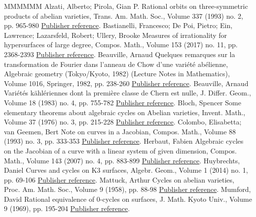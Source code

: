 \begin{thebibliography}{MMMMMM}
 Alzati, Alberto; Pirola, Gian P. Rational orbits on three-symmetric products of abelian varieties, Trans. Am. Math. Soc., Volume 337 (1993) no. 2, pp. 965-980 \href{https://ahl.centre-mersenne.org/item/AHL_2018__1__313_0/#alzatipirola}{Publisher reference}.
 Bastianelli, Francesco; De Poi, Pietro; Ein, Lawrence; Lazarsfeld, Robert; Ullery, Brooke Measures of irrationality for hypersurfaces of large degree, Compos. Math., Volume 153 (2017) no. 11, pp. 2368-2393 \href{https://ahl.centre-mersenne.org/item/AHL_2018__1__313_0/#lazarsfeld}{Publisher reference}.
 Beauville, Arnaud Quelques remarques sur la transformation de Fourier dans l’anneau de Chow d’une variété abélienne, Algebraic geometry (Tokyo/Kyoto, 1982) (Lecture Notes in Mathematics), Volume 1016, Springer, 1982, pp. 238-260 \href{https://ahl.centre-mersenne.org/item/AHL_2018__1__313_0/#beauvillefourier}{Publisher reference}.
 Beauville, Arnaud Variétés kählériennes dont la première classe de Chern est nulle, J. Differ. Geom., Volume 18 (1983) no. 4, pp. 755-782 \href{https://ahl.centre-mersenne.org/item/AHL_2018__1__313_0/#Beau}{Publisher reference}.
 Bloch, Spencer Some elementary theorems about algebraic cycles on Abelian varieties, Invent. Math., Volume 37 (1976) no. 3, pp. 215-228 \href{https://ahl.centre-mersenne.org/item/AHL_2018__1__313_0/#bloch}{Publisher reference}.
 Colombo, Elisabetta; van Geemen, Bert Note on curves in a Jacobian, Compos. Math., Volume 88 (1993) no. 3, pp. 333-353 \href{https://ahl.centre-mersenne.org/item/AHL_2018__1__313_0/#colombo}{Publisher reference}.
 Herbaut, Fabien Algebraic cycles on the Jacobian of a curve with a linear system of given dimension, Compos. Math., Volume 143 (2007) no. 4, pp. 883-899 \href{https://ahl.centre-mersenne.org/item/AHL_2018__1__313_0/#herbaut}{Publisher reference}.
 Huybrechts, Daniel Curves and cycles on K3 surfaces, Algebr. Geom., Volume 1 (2014) no. 1, pp. 69-106 \href{https://ahl.centre-mersenne.org/item/AHL_2018__1__313_0/#huy}{Publisher reference}.
 Mattuck, Arthur Cycles on abelian varieties, Proc. Am. Math. Soc., Volume 9 (1958), pp. 88-98 \href{https://ahl.centre-mersenne.org/item/AHL_2018__1__313_0/#mattuck}{Publisher reference}.
 Mumford, David Rational equivalence of 0-cycles on surfaces, J. Math. Kyoto Univ., Volume 9 (1969), pp. 195-204 \href{https://ahl.centre-mersenne.org/item/AHL_2018__1__313_0/#mumford}{Publisher reference}.

\end{thebibliography}
